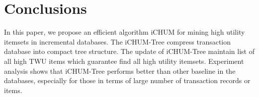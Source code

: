 \documentclass[runningheads,a4paper]{llncs}
\begin{document}
\section{Conclusions}
In this paper, we propose an efficient algorithm iCHUM for mining high utility itemsets in incremental databases. The iCHUM-Tree compress transaction database into compact tree structure. The update of iCHUM-Tree maintain list of all high TWU items which guarantee find all high utility itemsets. Experiment analysis shows that iCHUM-Tree performs better than other baseline in the databases, especially for those in terms of large number of transaction records or items. 






\end{document}
